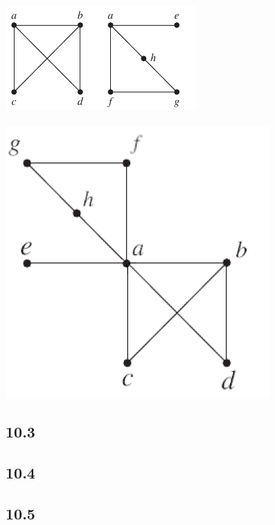 \begin{itemize}
            \includegraphics[]{img/10_2_58Q_graph.png}\\
            \answer \\
            \includegraphics[scale = 0.65]{img/10_2_58A_graph.png}



\end{itemize}

\subsection{10.3}

\subsection{10.4}

\subsection{10.5}
